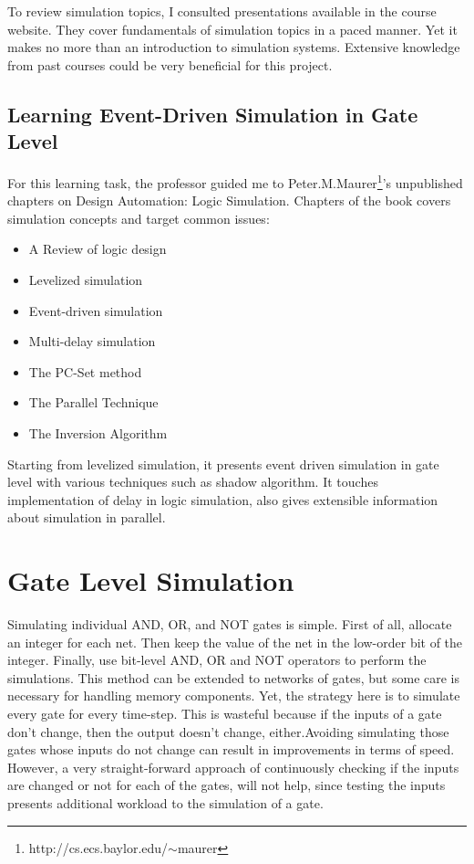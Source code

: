 \documentclass[a4paper,onesided,12pt]{report}
\begin{document}
 To review simulation topics, I consulted presentations available in the course website. They cover fundamentals of simulation topics in a paced manner. Yet it makes no more than an introduction to simulation systems. Extensive knowledge from past courses could be very beneficial for this project. 
 
 \section{Learning Event-Driven Simulation in Gate Level}
 
 For this learning task, the professor guided me to Peter.M.Maurer\footnote{http://cs.ecs.baylor.edu/$\sim$maurer}'s unpublished chapters on Design Automation: Logic Simulation. Chapters of the book covers simulation concepts and target common issues:
 \begin{itemize}
 \item A Review of logic design
 \item Levelized simulation
 \item Event-driven simulation
 \item Multi-delay simulation
 \item The PC-Set method
 \item The Parallel Technique
 \item The Inversion Algorithm
 \end{itemize} 
 
 Starting from levelized simulation, it presents event driven simulation in gate level with various techniques such as shadow algorithm. It touches implementation of delay in logic simulation, also gives extensible information about simulation in parallel.
 
 \chapter{Gate Level Simulation}
 \label{chapter:gate-level-simulation}
 
 Simulating individual AND, OR, and NOT gates is simple. First of all, allocate an integer for each net. Then keep the value of the net in the low-order bit of the integer. Finally, use bit-level AND, OR and NOT operators to perform the simulations. This method can be extended to networks of gates, but some care is necessary for handling memory components. Yet, the strategy here is to simulate every gate for every time-step. This is wasteful because if the inputs of a gate don't change, then the output doesn't change, either.Avoiding simulating those gates whose inputs do not change can result in improvements in terms of speed. However, a very straight-forward approach of continuously checking if the inputs are changed or not for each of the gates, will not help, since testing the inputs presents additional workload to the simulation of a gate. 
 
\end{document}
